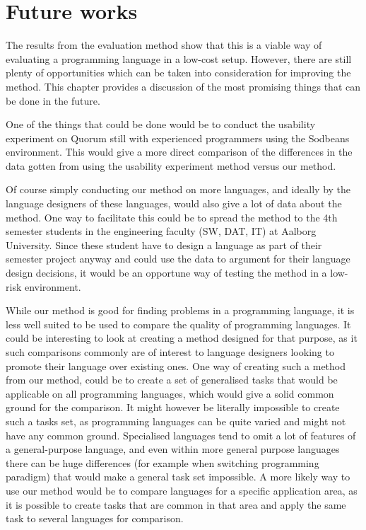 \chapter{Future works}
\label{chap:further_works}
The results from the evaluation method show that this is a viable way of evaluating a programming language in a low-cost setup. However, there are still plenty of opportunities which can be taken into consideration for improving the method. This chapter provides a discussion of the most promising things that can be done in the future.

One of the things that could be done would be to conduct the usability experiment on Quorum still with experienced programmers using the Sodbeans environment.
This would give a more direct comparison of the differences in the data gotten from using the usability experiment method versus our method.

Of course simply conducting our method on more languages, and ideally by the language designers of these languages, would also give a lot of data about the method.
One way to facilitate this could be to spread the method to the 4th semester students in the engineering faculty (SW, DAT, IT) at Aalborg University.
Since these student have to design a language as part of their semester project anyway and could use the data to argument for their language design decisions, it would be an opportune way of testing the method in a low-risk environment.

While our method is good for finding problems in a programming language, it is less well suited to be used to compare the quality of programming languages.
It could be interesting to look at creating a method designed for that purpose, as it such comparisons commonly are of interest to language designers looking to promote their language over existing ones.
One way of creating such a method from our method, could be to create a set of generalised tasks that would be applicable on all programming languages, which would give a solid common ground for the comparison.
It might however be literally impossible to create such a tasks set, as programming languages can be quite varied and might not have any common ground.
Specialised languages tend to omit a lot of features of a general-purpose language, and even within more general purpose languages there can be huge differences (for example when switching programming paradigm) that would make a general task set impossible.
A more likely way to use our method would be to compare languages for a specific application area, as it is possible to create tasks that are common in that area and apply the same task to several languages for comparison.

